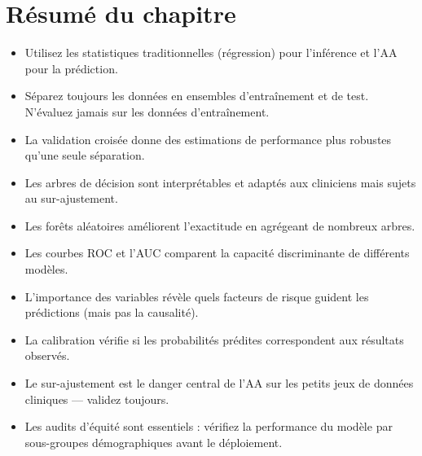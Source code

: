 \section{R\'esum\'e du chapitre}

\begin{itemize}
  \item Utilisez les statistiques traditionnelles (r\'egression) pour l'inf\'erence et l'AA pour la pr\'ediction.
  \item S\'eparez toujours les donn\'ees en ensembles d'entra\^inement et de test. N'\'evaluez jamais sur les donn\'ees d'entra\^inement.
  \item La validation crois\'ee donne des estimations de performance plus robustes qu'une seule s\'eparation.
  \item Les arbres de d\'ecision sont interpr\'etables et adapt\'es aux cliniciens mais sujets au sur-ajustement.
  \item Les for\^ets al\'eatoires am\'eliorent l'exactitude en agr\'egeant de nombreux arbres.
  \item Les courbes ROC et l'AUC comparent la capacit\'e discriminante de diff\'erents mod\`eles.
  \item L'importance des variables r\'ev\`ele quels facteurs de risque guident les pr\'edictions (mais pas la causalit\'e).
  \item La calibration v\'erifie si les probabilit\'es pr\'edites correspondent aux r\'esultats observ\'es.
  \item Le sur-ajustement est le danger central de l'AA sur les petits jeux de donn\'ees cliniques --- validez toujours.
  \item Les audits d'\'equit\'e sont essentiels : v\'erifiez la performance du mod\`ele par sous-groupes d\'emographiques avant le d\'eploiement.
\end{itemize}
